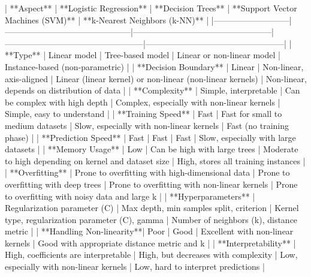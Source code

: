 | **Aspect**                | **Logistic Regression**                     | **Decision Trees**                                | **Support Vector Machines (SVM)**                 | **k-Nearest Neighbors (k-NN)**                    |
|---------------------------|---------------------------------------------|--------------------------------------------------|--------------------------------------------------|--------------------------------------------------|
| **Type**                  | Linear model                                | Tree-based model                                 | Linear or non-linear model                        | Instance-based (non-parametric)                   |
| **Decision Boundary**     | Linear                                      | Non-linear, axis-aligned                         | Linear (linear kernel) or non-linear (non-linear kernels) | Non-linear, depends on distribution of data       |
| **Complexity**            | Simple, interpretable                       | Can be complex with high depth                   | Complex, especially with non-linear kernels       | Simple, easy to understand                        |
| **Training Speed**        | Fast                                        | Fast for small to medium datasets                | Slow, especially with non-linear kernels          | Fast (no training phase)                          |
| **Prediction Speed**      | Fast                                        | Fast                                             | Fast                                              | Slow, especially with large datasets              |
| **Memory Usage**          | Low                                         | Can be high with large trees                     | Moderate to high depending on kernel and dataset size | High, stores all training instances               |
| **Overfitting**           | Prone to overfitting with high-dimensional data | Prone to overfitting with deep trees             | Prone to overfitting with non-linear kernels      | Prone to overfitting with noisy data and large k  |
| **Hyperparameters**       | Regularization parameter (C)                | Max depth, min samples split, criterion          | Kernel type, regularization parameter (C), gamma  | Number of neighbors (k), distance metric          |
| **Handling Non-linearity**| Poor                                        | Good                                             | Excellent with non-linear kernels                 | Good with appropriate distance metric and k       |
| **Interpretability**      | High, coefficients are interpretable        | High, but decreases with complexity              | Low, especially with non-linear kernels           | Low, hard to interpret predictions                |
